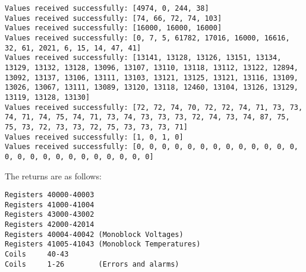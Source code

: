 \documentclass[10pt,]{article}
\begin{document}
\begin{lstlisting}
Values received successfully: [4974, 0, 244, 38]
Values received successfully: [74, 66, 72, 74, 103]
Values received successfully: [16000, 16000, 16000]
Values received successfully: [0, 7, 5, 61782, 17016, 16000, 16616, 32, 61, 2021, 6, 15, 14, 47, 41]
Values received successfully: [13141, 13128, 13126, 13151, 13134, 13129, 13132, 13128, 13096, 13107, 13110, 13118, 13112, 13122, 12894, 13092, 13137, 13106, 13111, 13103, 13121, 13125, 13121, 13116, 13109, 13026, 13067, 13111, 13089, 13120, 13118, 12460, 13104, 13126, 13129, 13119, 13128, 13130]
Values received successfully: [72, 72, 74, 70, 72, 72, 74, 71, 73, 73, 74, 71, 74, 75, 74, 71, 73, 74, 73, 73, 73, 72, 74, 73, 74, 87, 75, 75, 73, 72, 73, 73, 72, 75, 73, 73, 73, 71]
Values received successfully: [1, 0, 1, 0]
Values received successfully: [0, 0, 0, 0, 0, 0, 0, 0, 0, 0, 0, 0, 0, 0, 0, 0, 0, 0, 0, 0, 0, 0, 0, 0, 0]
\end{lstlisting}

The returns are as follows:

\begin{lstlisting}
Registers 40000-40003
Registers 41000-41004
Registers 43000-43002
Registers 42000-42014
Registers 40004-40042 (Monoblock Voltages)
Registers 41005-41043 (Monoblock Temperatures)
Coils     40-43
Coils     1-26        (Errors and alarms)
\end{lstlisting}
\end{document}
